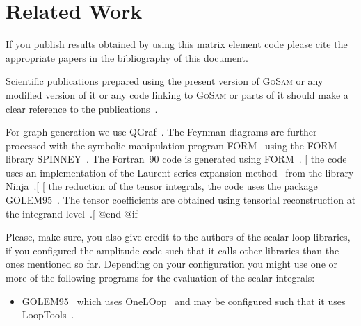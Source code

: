 {{{{{{{{\printindex

\section{Related Work}
If you publish results obtained by using this matrix element code
please cite the appropriate papers in the bibliography of this document.

Scientific publications prepared using the present version of
\textsc{GoSam} or any modified version of it or any code linking to
\textsc{GoSam} or parts of it should make a clear
reference to the publications~\cite{Cullen:2014yla,Cullen:2011ac,Braun:2025afl}.

For graph generation we use QGraf~\cite{Nogueira:1991ex}.
The Feynman diagrams are further processed with the symbolic manipulation
program FORM~\cite{Kuipers:2012rf,Vermaseren:2000nd} using the FORM library
SPINNEY~\cite{Cullen:2010jv}.
The Fortran~90 code is generated using
FORM~\cite{Kuipers:2012rf,Vermaseren:2000nd}.
[%
the code uses an implementation of the Laurent series expansion
method~\cite{Mastrolia:2012bu}
from the library Ninja~\cite{Peraro:2014cba}.[%
[%
the reduction of the tensor integrals, the code uses the
package GOLEM95~\cite{Guillet:2013msa,Binoth:2008uq,Cullen:2011kv}.
The tensor coefficients are
obtained using tensorial reconstruction at the integrand
level~\cite{Heinrich:2010ax}.[%
@end @if %

Please, make sure, you also give credit to the authors of the scalar
loop libraries, if you configured the amplitude code such that it calls
other libraries than the ones mentioned so far. Depending on your
configuration you might use one or more of the following programs for
the evaluation of the scalar integrals:
\begin{itemize}
\item GOLEM95~\cite{Binoth:2008uq,Guillet:2013msa} which uses OneLOop~\cite{vanHameren:2010cp}
   and may be configured such that it uses
   LoopTools~\cite{Hahn:1998yk,vanOldenborgh:1990yc}.
\end{itemize}

}}}}}}}}
